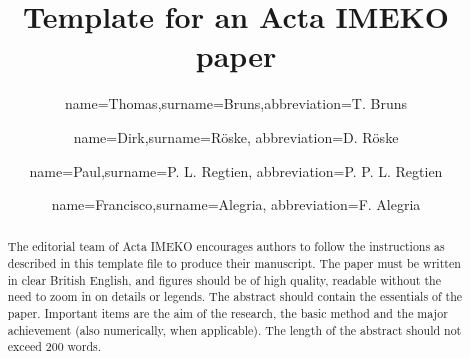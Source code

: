 \documentclass[final]{imeko_acta}
\begin{document}
\title{Template for an Acta IMEKO paper} %

\author[1]{name=Thomas,surname=Bruns,abbreviation=T. Bruns}
\author[2]{name=Dirk,surname=Röske, abbreviation=D. Röske}
\author[2]{name=Paul,surname=P. L. Regtien, abbreviation=P. P. L. Regtien}
\author[3]{name=Francisco,surname=Alegria, abbreviation=F. Alegria}





\begin{abstract}
	The editorial team of Acta IMEKO encourages authors to follow the instructions as described in this template file to produce their
	manuscript. The paper must be written in clear British English, and figures should be of high quality, readable without the need to zoom
	in on details or legends. The abstract should contain the essentials of the paper. Important items are the aim of the research, the basic
	method and the major achievement (also numerically, when applicable). The length of the abstract should not exceed 200 words.
\end{abstract}

\maketitle %

\end{document}
